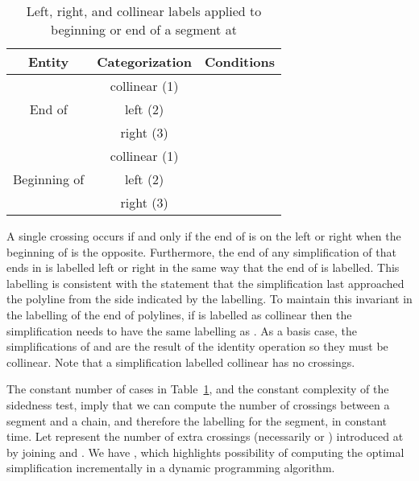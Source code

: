 \documentclass{article}
\begin{document}
\begin{table}
\begin{center}
\begin{tabular}{|c|c|c|}
\hline
Entity & Categorization & Conditions \\
\hline
\multirow{8}{*}{End of } & \multirow{2}{*}{collinear (1)} &  \\
&&  \\ 
\cline{2-3}
& \multirow{3}{*}{left (2)} &  \\
& &   \\
& &   \\
\cline{2-3}
& \multirow{3}{*}{right (3)} &  \\
& &   \\
& &  \\
\hline
\multirow{8}{*}{Beginning of } & \multirow{2}{*}{collinear (1)} &  \\
&&  \\ 
\cline{2-3}
& \multirow{3}{*}{left (2)} &  \\
& &   \\
& &   \\
\cline{2-3}
& \multirow{3}{*}{right (3)} &  \\
& &   \\
& &  \\
\hline
\end{tabular}
\caption{Left, right, and collinear labels applied to beginning or end of a segment at }
\label{tab:leftright}
\end{center}
\end{table}

A single crossing occurs if and only if the end of  is on
the left or right when the beginning of  is the opposite. 
Furthermore, the end of any simplification  of  that ends
in  is labelled left or right in the same way that the end
of  is labelled.  This labelling is consistent with the
statement that the simplification last approached the polyline  from the
side indicated by the labelling.  To maintain this invariant in the
labelling of the end of polylines, if  is labelled as
collinear then the simplification  needs to have the same labelling
as .  As a basis case, the simplifications of  and
 are the result of the identity operation so they must be
collinear.  Note that a simplification labelled collinear
has no crossings.

The constant number of cases in Table~\ref{tab:leftright}, and the
constant complexity of the sidedness test, imply that we can compute the
number of crossings between a segment and a chain, and therefore the
labelling for the segment, in constant time.
Let  represent the number of extra crossings
(necessarily  or ) introduced at  by joining  and
.  We have , which highlights possibility of computing
the optimal simplification incrementally in a dynamic programming
algorithm.
\end{document}
